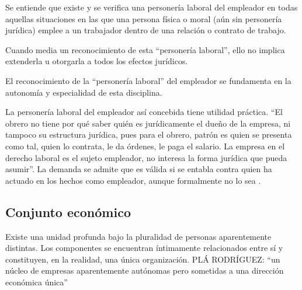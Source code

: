 \documentclass[spanish,12pt,a4paper,titlepage]{report}
\begin{document}
Se entiende que existe y se verifica una personería laboral del empleador en todas aquellas situaciones en las que una persona física o moral (aún sin personería jurídica) emplee a un trabajador dentro de una relación o contrato de trabajo.

Cuando media un reconocimiento de esta “personería laboral”, ello no implica extenderla u otorgarla a todos los efectos jurídicos.

El reconocimiento de la “personería laboral” del empleador se fundamenta en la autonomía y especialidad de esta disciplina.

La personería laboral del empleador así concebida tiene utilidad práctica.
“El obrero no tiene por qué saber quién es jurídicamente el dueño de la empresa,  ni tampoco su estructura jurídica, pues para el obrero, patrón es quien se presenta como tal, quien lo contrata, le da órdenes, le paga el salario. La empresa en el derecho laboral es el sujeto empleador, no interesa la forma jurídica que pueda asumir''. La demanda se admite que es válida si se entabla contra quien ha actuado en los hechos como empleador, aunque formalmente no lo sea .

\subsection{Conjunto económico}

Existe una unidad profunda bajo la pluralidad de personas aparentemente distintas. Los componentes se encuentran íntimamente relacionados entre sí y constituyen, en la realidad, una única organización.
PLÁ RODRÍGUEZ:  “un núcleo de empresas aparentemente autónomas pero sometidas a una dirección económica única”

\newpage
\end{document}
